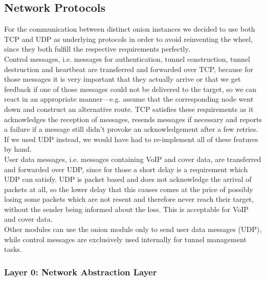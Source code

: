 \documentclass{article}
\begin{document}
\subsection{Network Protocols}
For the communication between distinct onion instances we decided to use both TCP and UDP as underlying protocols in order to avoid reinventing the wheel, since they both fulfill the respective requirements perfectly. \\
Control messages, i.e. messages for authentication, tunnel construction, tunnel destruction and heartbeat are transferred and forwarded over TCP, because for those messages it is very important that they actually arrive or that we get feedback if one of those messages could not be delivered to the target, so we can react in an appropriate manner---e.g. assume that the corresponding node went down and construct an alternative route. TCP satisfies these requirements as it acknowledges the reception of messages, resends messages if necessary and reports a failure if a message still didn't provoke an acknowledgement after a few retries. If we used UDP instead, we would have had to re-implement all of these features by hand. \\
User data messages, i.e. messages containing VoIP and cover data, are transferred and forwarded over UDP, since for those a short delay is a requirement which UDP can satisfy. UDP is packet based and does not acknowledge the arrival of packets at all, so the lower delay that this causes comes at the price of possibly losing some packets which are not resent and therefore never reach their target, without the sender being informed about the loss. This is acceptable for VoIP and cover data. \\
Other modules can use the onion module only to send user data messages (UDP), while control messages are exclusively used internally for tunnel management tasks.

\subsubsection{Layer 0: Network Abstraction Layer}
\end{document}
